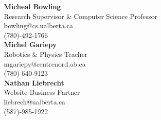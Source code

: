 \documentclass[11pt, a4paper]{awesome-cv} %
\begin{document}
\makecvheader %

\setlength\tabcolsep{0pt}
\setlength{\extrarowheight}{0pt}
\newcolumntype{+}{>{\global\let\currentrowstyle\relax}}
\newcolumntype{^}{>{\currentrowstyle}}
\newcommand{\rowstyle}[1]{\gdef\currentrowstyle{#1}%
#1\ignorespaces
}

\begin{cvletter}


  \vspace{0.2cm}
  \textbf{Micheal Bowling}\\
  Research Supervisor \& Computer Science Professor\\
  bowling@cs.ualberta.ca\\
  (780)-492-1766\\
  

  \vspace{0.2cm}
  \textbf{Michel Gariepy}\\
  Robotics \& Physics Teacher\\
  mgariepy@centrenord.ab.ca\\
  (780)-640-9123\\

  \vspace{0.2cm}
  \textbf{Nathan Liebrecht}\\
  Website Business Partner\\
  liebrech@ualberta.ca\\
  (587)-985-1922\\

\end{cvletter}
\end{document}
